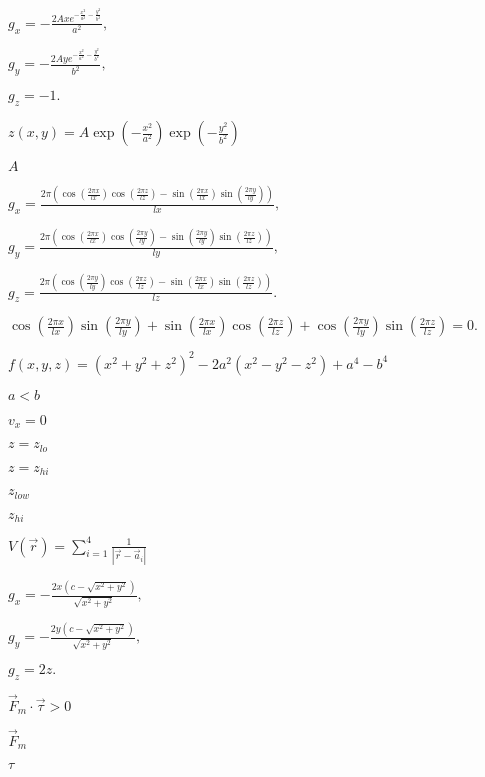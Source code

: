 \documentclass{article}
\begin{document}
$ g_x = -\frac{2 A x e^{-\frac{x^2}{a^2}-\frac{y^2}{b^2}}}{a^2}, $
\pagebreak

$ g_y = -\frac{2 A y e^{-\frac{x^2}{a^2}-\frac{y^2}{b^2}}}{b^2}, $
\pagebreak

$ g_z = -1. $
\pagebreak

$ z(x,y)=A \exp\left(-\frac{x^2}{a^2}\right)\exp\left(-\frac{y^2}{b^2}\right) $
\pagebreak

$ A $
\pagebreak

$ g_x = \frac{2 \pi \left(\cos \left(\frac{2 \pi x}{lx}\right) \cos \left(\frac{2 \pi z}{lz}\right)-\sin \left(\frac{2 \pi x}{lx}\right) \sin \left(\frac{2 \pi y}{ly}\right)\right)}{lx}, $
\pagebreak

$ g_y = \frac{2 \pi \left(\cos \left(\frac{2 \pi x}{lx}\right) \cos \left(\frac{2 \pi y}{ly}\right)-\sin \left(\frac{2 \pi y}{ly}\right) \sin \left(\frac{2 \pi z}{lz}\right)\right)}{ly}, $
\pagebreak

$ g_z = \frac{2 \pi \left(\cos \left(\frac{2 \pi y}{ly}\right) \cos \left(\frac{2 \pi z}{lz}\right)-\sin \left(\frac{2 \pi x}{lx}\right) \sin \left(\frac{2 \pi z}{lz}\right)\right)}{lz}. $
\pagebreak

$ \cos \left(\frac{2 \pi x}{lx}\right) \sin \left(\frac{2 \pi y}{ly}\right)+\sin \left(\frac{2 \pi x}{lx}\right) \cos \left(\frac{2 \pi z}{lz}\right)+\cos \left(\frac{2 \pi y}{ly}\right) \sin \left(\frac{2 \pi z}{lz}\right) = 0. $
\pagebreak

$ f(x,y,z) = (x^2+y^2+z^2)^2 - 2a^2(x^2-y^2-z^2)+a^4-b^4 $
\pagebreak

$ a < b $
\pagebreak

$ v_x = 0 $
\pagebreak

$ z = z_{lo} $
\pagebreak

$ z = z_{hi} $
\pagebreak

$ z_{low} $
\pagebreak

$ z_{hi} $
\pagebreak

$ V(\vec r) = \sum_{i=1}^{4}\frac{1}{|\vec r - \vec a_i|} $
\pagebreak

$ g_x = -\frac{2x\left(c-\sqrt{x^2+y^2}\right)}{\sqrt{x^2+y^2}}, $
\pagebreak

$ g_y = -\frac{2y\left(c-\sqrt{x^2+y^2}\right)}{\sqrt{x^2+y^2}}, $
\pagebreak

$ g_z = 2z. $
\pagebreak

$ \vec F_m \cdot \vec \tau > 0 $
\pagebreak

$ \vec F_m $
\pagebreak

$ \tau $
\pagebreak
\end{document}
